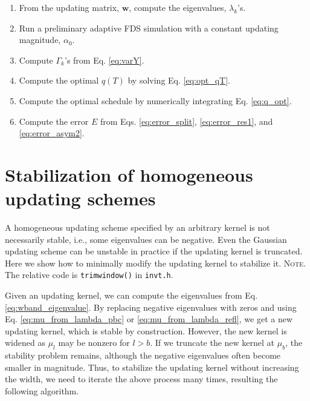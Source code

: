 \documentclass[reprint, floatfix]{revtex4-1}
\newcommand{\note}[1]{{\color{DarkGreen}\footnotesize \textsc{Note.} #1}}
\begin{document}
\begin{enumerate}

\item
From the updating matrix, $\mathbf w$,
compute the eigenvalues, $\lambda_k$'s.

\item
Run a preliminary adaptive FDS simulation
with a constant updating magnitude, $\alpha_0$.

\item
Compute $\Gamma_k$'s from Eq. \eqref{eq:varY}.

\item
Compute the optimal $q(T)$ by solving Eq. \eqref{eq:opt_qT}.

\item
Compute the optimal schedule by
numerically integrating Eq. \eqref{eq:q_opt}.

\item
Compute the error $E$ from
Eqs. \eqref{eq:error_split},
  \eqref{eq:error_res1},
  and
  \eqref{eq:error_asym2}.

\end{enumerate}







\section{\label{sec:stabilize_wband}
Stabilization of homogeneous updating schemes}



%
A homogeneous updating scheme
specified by an arbitrary kernel
is not necessarily stable,
i.e., some eigenvalues can be negative.
%
%
  Even
  the Gaussian updating scheme can be unstable
  in practice
  if the updating kernel is truncated.
%
Here we show how to minimally modify
the updating kernel
to stabilize it.
%
\note{The relative code is \texttt{trimwindow()} in \texttt{invt.h}.
}


Given an updating kernel,
we can compute the eigenvalues from
Eq. \eqref{eq:wband_eigenvalue}.
%
By replacing negative eigenvalues with zeros and
using Eq. \eqref{eq:mu_from_lambda_pbc}
or \eqref{eq:mu_from_lambda_refl},
we get a new updating kernel,
which is stable by construction.
%
However, the new kernel is widened
as $\mu_l$ may be nonzero for $l > b$.
%
If we truncate the new kernel at $\mu_b$,
the stability problem remains,
although the negative eigenvalues
often become smaller in magnitude.
%
Thus, to stabilize the updating kernel
without increasing the width,
we need to iterate the above process many times,
resulting the following algorithm.
\end{document}
